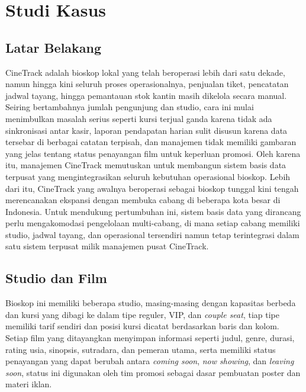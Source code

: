 \documentclass[letter,12pt,bahasa]{article}
\begin{document}
\clearpage

\section{Studi Kasus}

\subsection{Latar Belakang}

CineTrack adalah bioskop lokal yang telah beroperasi lebih dari satu dekade, namun hingga kini seluruh proses operasionalnya, penjualan tiket, pencatatan jadwal tayang, hingga pemantauan stok kantin masih dikelola secara manual. Seiring bertambahnya jumlah pengunjung dan studio, cara ini mulai menimbulkan masalah serius seperti kursi terjual ganda karena tidak ada sinkronisasi antar kasir, laporan pendapatan harian sulit disusun karena data tersebar di berbagai catatan terpisah, dan manajemen tidak memiliki gambaran yang jelas tentang status penayangan film untuk keperluan promosi. Oleh karena itu, manajemen CineTrack memutuskan untuk membangun sistem basis data terpusat yang mengintegrasikan seluruh kebutuhan operasional bioskop. Lebih dari itu, CineTrack yang awalnya beroperasi sebagai bioskop tunggal kini tengah merencanakan ekspansi dengan membuka cabang di beberapa kota besar di Indonesia. Untuk mendukung pertumbuhan ini, sistem basis data yang dirancang perlu mengakomodasi pengelolaan multi-cabang, di mana setiap cabang memiliki studio, jadwal tayang, dan operasional tersendiri namun tetap terintegrasi dalam satu sistem terpusat milik manajemen pusat CineTrack.

\subsection{Studio dan Film}

Bioskop ini memiliki beberapa studio, masing-masing dengan kapasitas berbeda dan kursi yang dibagi ke dalam tipe reguler, VIP, dan \textit{couple seat}, tiap tipe memiliki tarif sendiri dan posisi kursi dicatat berdasarkan baris dan kolom. Setiap film yang ditayangkan menyimpan informasi seperti judul, genre, durasi, rating usia, sinopsis, sutradara, dan pemeran utama, serta memiliki status penayangan yang dapat berubah antara \textit{coming soon}, \textit{now showing}, dan \textit{leaving soon}, status ini digunakan oleh tim promosi sebagai dasar pembuatan poster dan materi iklan.
\end{document}
